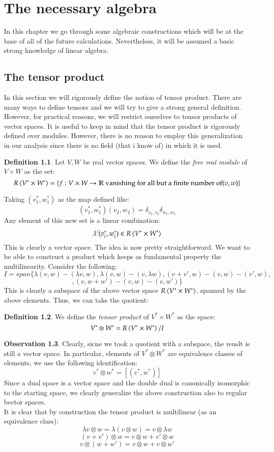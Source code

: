 \documentclass[12pt,a4paper]{report}
\theoremstyle{definition}
\newtheorem{Def}{Definition}[chapter]
\theoremstyle{Theorem}
\theoremstyle{break}
\theoremstyle{definition}
\newtheorem{Obs}[Def]{Observation}
\begin{document}
	\tableofcontents
	\chapter{The necessary algebra}
	In this chapter we go through some algebraic constructions which will be at the base of all of the future calculations. Nevertheless, it will be assumed a basic strong knowledge of linear algebra.
	\section{The tensor product}
	In this section we will rigorously define the notion of tensor product. There are many ways to define tensors and we will try to give a strong general definition. However, for practical reasons, we will restrict ourselves to tensor products of vector spaces. It is useful to keep in mind that the tensor product is rigorously defined over modules. However, there is no reason to employ this generalization in our analysis since there is no field (that i know of) in which it is used.
	\begin{Def}\label{def_1.1.1}
		Let $V,W$ be real vector spaces. We define the \textit{free real module} of $V\times W$ as the set:
		$$R\braket{V^*\times W^*}=\{f:V\times W\rightarrow\mathbb{R}\hbox{ vanishing for all but a finite number of} (v,w)\}$$  
	\end{Def}
	Taking $(v^*_1,w^*_1)$ as the map defined like:
	$$(v^*_1,w^*_1)(v_2,w_2)=\delta_{v_1,v_2}\delta_{w_1,w_2}$$
	Any element of this new set is a linear combination:
	$$\lambda^i(v_i^*,w_i^*)\in R\braket{V^*\times W^*}$$
	This is clearly a vector space. The idea is now pretty straightforward. We want to be able to construct a product which keeps as fundamental property the multilinearity. Consider the following:
	$$I=span\bigg\{\lambda(v,w)-(\lambda v,w),\lambda(v,w)-(v,\lambda w),(v+v',w)-(v,w)-(v',w),$$$$,(v,w+w')-(v,w)-(v,w')\bigg\}$$
	This is clearly a subspace of the above vector space $R\braket{V^*\times W^*}$, spanned by the above elements. Thus, we can take the quotient:
	\begin{Def}\label{def_1.1.2}
		We define the \textit{tensor product} of $V^*\times W^*$ as the space:
		$$V^*\otimes W^*=R\braket{V^*\times W^*}/I$$
	\end{Def} 
	\begin{Obs}\label{obs_1.1.1}
		Clearly, sicne we took a quotient with a subspace, the reuslt is still a vector space. In particular, elements of $V^*\otimes W^*$ are equivalence classes of elements, we use the following identification:
		$$v^*\otimes w^*=[(v^*,w^*)]$$
		Since a dual space is a vector space and the double dual is canonically isomorphic to the starting space, we clearly generalize the above construction also to regular bector spaces.\\
		It is clear that by construction the tensor product is multilinear (as an equivalence class):
		$$\lambda v\otimes w=\lambda (v\otimes w)= v\otimes \lambda w$$
		$$(v+v')\otimes w=v\otimes w+v'\otimes w$$
		$$v\otimes (w+w')=v\otimes w+v\otimes w'$$
	\end{Obs}
\end{document}

